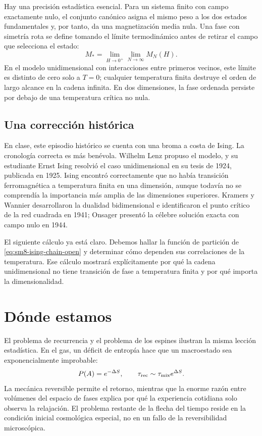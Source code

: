 Hay una precisión estadística esencial. Para un sistema finito con campo exactamente nulo, el conjunto canónico asigna el mismo peso a los dos estados fundamentales y, por tanto, da una magnetización media nula. Una fase con simetría rota se define tomando el límite termodinámico antes de retirar el campo que selecciona el estado:
\begin{equation}
 M_*=\lim_{H\to0^+}\lim_{N\to\infty}M_N(H).
 \label{eq:sm8-order-of-limits}
\end{equation}
En el modelo unidimensional con interacciones entre primeros vecinos, este límite es distinto de cero solo a \(T=0\); cualquier temperatura finita destruye el orden de largo alcance en la cadena infinita. En dos dimensiones, la fase ordenada persiste por debajo de una temperatura crítica no nula.

\subsection{Una corrección histórica}

En clase, este episodio histórico se cuenta con una broma a costa de Ising. La cronología correcta es más benévola. Wilhelm Lenz propuso el modelo, y su estudiante Ernst Ising resolvió el caso unidimensional en su tesis de 1924, publicada en 1925. Ising encontró correctamente que no había transición ferromagnética a temperatura finita en una dimensión, aunque todavía no se comprendía la importancia más amplia de las dimensiones superiores. Kramers y Wannier desarrollaron la dualidad bidimensional e identificaron el punto crítico de la red cuadrada en 1941; Onsager presentó la célebre solución exacta con campo nulo en 1944.

El siguiente cálculo ya está claro. Debemos hallar la función de partición de
\eqref{eq:sm8-ising-chain-open} y determinar cómo dependen sus correlaciones de la temperatura. Ese cálculo mostrará explícitamente por qué la cadena unidimensional no tiene transición de fase a temperatura finita y por qué importa la dimensionalidad.

\section{Dónde estamos}

El problema de recurrencia y el problema de los espines ilustran la misma lección estadística. En el gas, un déficit de entropía hace que un macroestado sea exponencialmente improbable:
\begin{equation}
 P(A)=e^{-\Delta S},
 \qquad
 \tau_{\rm rec}\sim\tau_{\rm mix}e^{\Delta S}.
 \label{eq:sm8-summary-recurrence}
\end{equation}
La mecánica reversible permite el retorno, mientras que la enorme razón entre volúmenes del espacio de fases explica por qué la experiencia cotidiana solo observa la relajación. El problema restante de la flecha del tiempo reside en la condición inicial cosmológica especial, no en un fallo de la reversibilidad microscópica.

